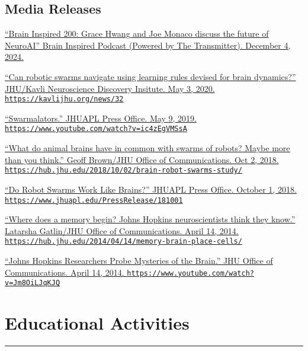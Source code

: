 \documentclass[10pt]{article}
\newcommand{\itemtitle}[1]{{\color{hopkinsblue}\ul{#1}}}
\newcommand{\aurl}[1]{{\color{dimgray}\texttt{#1}}}
\begin{document}
\subsection*{Media Releases}
\label{sec:media}
\begin{description}
  \item
    \href{https://www.thetransmitter.org/brain-inspired/grace-hwang-and-joe-monaco-discuss-the-future-of-neuroai/}
    {``\itemtitle{Brain Inspired 200: Grace Hwang and Joe Monaco discuss the
      future of NeuroAI}'' Brain Inspired Podcast (Powered by The Transmitter).
    December 4, 2024.}
  \item \href{https://kavlijhu.org/news/32} {``\itemtitle{Can
        robotic swarms navigate using learning rules devised for brain
      dynamics?}'' JHU/Kavli Neuroscience Discovery Insitute. May 3, 2020.
    \aurl{https://kavlijhu.org/news/32}}
  \item \href{https://www.youtube.com/watch?v=ic4zEgVMSsA}
    {``\itemtitle{Swarmalators}.'' JHUAPL Press Office. May 9, 2019.
    \aurl{https://www.youtube.com/watch?v=ic4zEgVMSsA}}
  \item \href{https://hub.jhu.edu/2018/10/02/brain-robot-swarms-study/}
    {``\itemtitle{What do animal brains have in common with swarms of robots?
      Maybe more than you think}.'' Geoff Brown/JHU Office of Communications. Oct 2,
    2018. \aurl{https://hub.jhu.edu/2018/10/02/brain-robot-swarms-study/}}
  \item \href{https://www.jhuapl.edu/PressRelease/181001}
    {``\itemtitle{Do Robot Swarms Work Like Brains?}'' JHUAPL Press Office. October 1, 2018.
    \aurl{https://www.jhuapl.edu/PressRelease/181001}}
  \item \href{https://hub.jhu.edu/2014/04/14/memory-brain-place-cells/}
    {``\itemtitle{Where does a memory begin? Johns Hopkins neuroscientists think they
      know}.'' Latarsha Gatlin/JHU Office of Communications. April 14, 2014.
    \aurl{https://hub.jhu.edu/2014/04/14/memory-brain-place-cells/}}
  \item \href{https://www.youtube.com/watch?v=Jm8OiLJqKJQ}
    {``\itemtitle{Johns Hopkins Researchers Probe Mysteries of
      the Brain}.'' JHU Office of Communications. April 14, 2014.
    \aurl{https://www.youtube.com/watch?v=Jm8OiLJqKJQ}}
\end{description}


\section*{Educational Activities}
\vspace{-0.1in}
\hrule
\vspace{0.15in}
\end{document}
